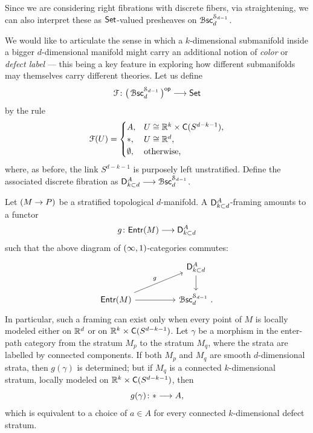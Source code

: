 \begin{example}\label{ch5:: ex: codim 1 defect}
Since we are considering right fibrations with discrete fibers, via straightening, we can also interpret these as $\operatorname{{\mathsf{Set}}}$-valued presheaves on $\operatorname{\mathcal B\mathsf{sc}}_{d}^{\mathcal S_{d-1}}$. 

We would like to articulate the sense in which a $k$-dimensional submanifold inside a bigger $d$-dimensional manifold might carry an additional notion of \emph{color} or \emph{defect label} — this being a key feature in exploring how different submanifolds may themselves carry different theories. Let us define
\begin{equation}
    \mathcal F\colon \big(\operatorname{\mathcal B\mathsf{sc}}_{d}^{\mathcal S_{d-1}}\big)^{\mathsf{op}} \longrightarrow \operatorname{{\mathsf{Set}}}
\end{equation}
by the rule
\begin{equation}
    \mathcal F(U)=
    \begin{cases}
        A, & U \cong \mathbb R^{k}\times \mathsf C(S^{d-k-1}),\\
        *, & U \cong \mathbb R^{d},\\
        \emptyset, & \text{otherwise,}
    \end{cases}
\end{equation}
where, as before, the link $S^{d-k-1}$ is purposely left unstratified. Define the associated discrete fibration as $\mathsf D_{k \subset d}^{A} \longrightarrow \operatorname{\mathcal B\mathsf{sc}}_{d}^{\mathcal S_{d-1}}$.

Let $(M \rightarrow P)$ be a stratified topological $d$-manifold. A $\mathsf D_{k\subset d}^{A}$-framing amounts to a functor 
\begin{equation}
g \colon {\sf Entr}(M) \longrightarrow \mathsf D^{A}_{k\subset d}
\end{equation} 
such that the above diagram of $(\operatorname{\infty},1)$-categories commutes:
\begin{equation}
    \begin{tikzcd}[ampersand replacement=\&]
        \&\& {\sD^{A}_{k \subset d}} \\
        {\entr(M)} \&\& {\Bsc_d^{\cS_{d-1}}}\,\, .
        \arrow[from=1-3, to=2-3]
        \arrow["g", from=2-1, to=1-3]
        \arrow[from=2-1, to=2-3]
    \end{tikzcd}
\end{equation}
In particular, such a framing can exist only when every point of $M$ is locally modeled either on $\mathbb R^d$ or on $\mathbb R^{k}\times \mathsf C(S^{d-k-1})$. Let $\gamma$ be a morphism in the enter-path category from the stratum $M_p$ to the stratum $M_q$, where the strata are labelled by connected components. If both $M_p$ and $M_q$ are smooth $d$-dimensional strata, then $g(\gamma)$ is determined; but if $M_q$ is a connected $k$-dimensional stratum, locally modeled on $\mathbb R^{k}\times \mathsf C(S^{d-k-1})$, then 
\begin{equation}
    g(\gamma) \colon * \longrightarrow A,
\end{equation}  
which is equivalent to a choice of $a\in A$ for every connected $k$-dimensional defect stratum. 
\end{example}



